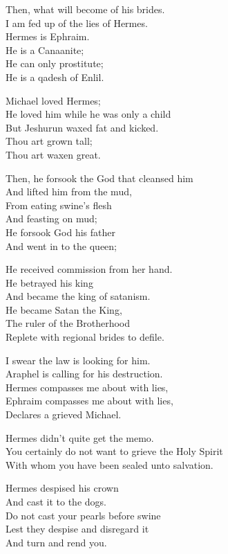 \documentclass[
]{book}
\begin{document}
Then, what will become of his brides.\\
I am fed up of the lies of Hermes.\\
Hermes is Ephraim.\\
He is a Canaanite;\\
He can only prostitute;\\
He is a qadesh of Enlil.

Michael loved Hermes;\\
He loved him while he was only a child\\
But Jeshurun waxed fat and kicked.\\
Thou art grown tall;\\
Thou art waxen great.

Then, he forsook the God that cleansed him\\
And lifted him from the mud,\\
From eating swine's flesh\\
And feasting on mud;\\
He forsook God his father\\
And went in to the queen;

He received commission from her hand.\\
He betrayed his king\\
And became the king of satanism.\\
He became Satan the King,\\
The ruler of the Brotherhood\\
Replete with regional brides to defile.

I swear the law is looking for him.\\
Araphel is calling for his destruction.\\
Hermes compasses me about with lies,\\
Ephraim compasses me about with lies,\\
Declares a grieved Michael.

Hermes didn't quite get the memo.\\
You certainly do not want to grieve the Holy Spirit\\
With whom you have been sealed unto salvation.

Hermes despised his crown\\
And cast it to the dogs.\\
Do not cast your pearls before swine\\
Lest they despise and disregard it\\
And turn and rend you.
\end{document}
